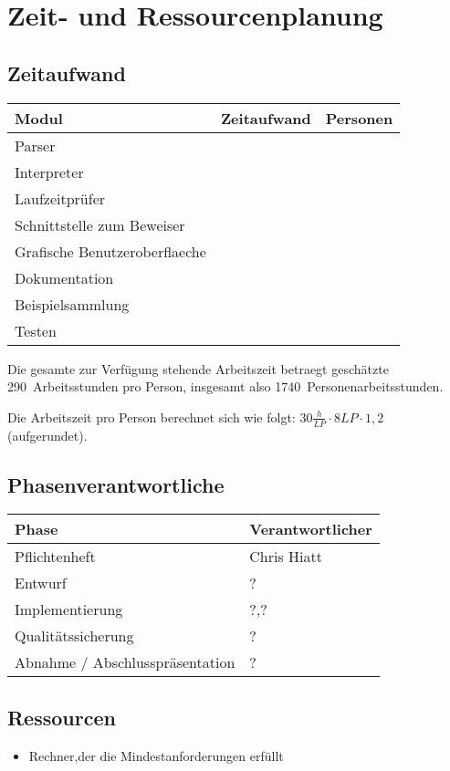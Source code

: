 \section{Zeit- und Ressourcenplanung}%

\subsection{Zeitaufwand}%

  \begin{tabular}{| l | l | l | }
    \hline
    \textbf{Modul} & \textbf{Zeitaufwand} & \textbf{Personen} \\ \hline
    Parser &  &  \\ \hline
    Interpreter &  &  \\ \hline
    Laufzeitprüfer &  &  \\ \hline
    Schnittstelle zum Beweiser &  &  \\ \hline
    Grafische Benutzeroberflaeche &  &  \\ \hline
    Dokumentation &  &  \\ \hline
    Beispielsammlung &  &  \\ \hline
    Testen &  &  \\ \hline %
  \end{tabular}

Die gesamte zur Verfügung stehende Arbeitszeit betraegt geschätzte 290~Arbeitsstunden pro Person, insgesamt also 1740~Personenarbeitsstunden.

Die Arbeitszeit pro Person berechnet sich wie folgt: $30\frac{h}{LP} \cdot 8LP \cdot 1,2$ (aufgerundet).

\subsection{Phasenverantwortliche}%

  \begin{tabular}{| l | l | }
    \hline
    \textbf{Phase} & \textbf{Verantwortlicher} \\ \hline
    Pflichtenheft & Chris Hiatt \\ \hline
    Entwurf & ? \\ \hline
    Implementierung & ?,? \\ \hline
    Qualitätssicherung & ? \\ \hline
    Abnahme / Abschlusspräsentation & ? \\ \hline
  \end{tabular}

\subsection{Ressourcen}%

\begin{itemize}%
    \item Rechner,der die Mindestanforderungen erfüllt
\end{itemize}%
